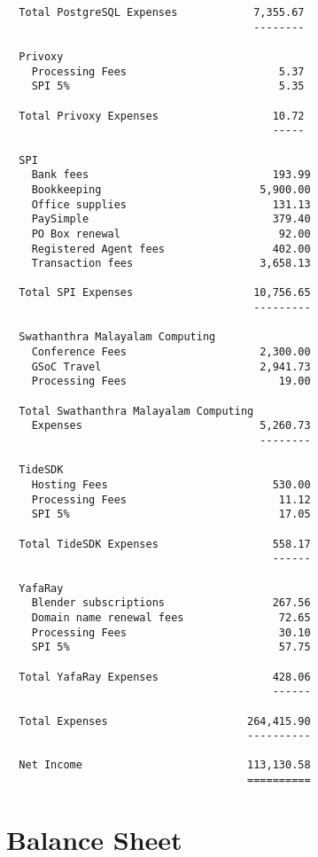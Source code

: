 \documentclass[letterpaper]{report}
\begin{document}
\begin{verbatim}
  Total PostgreSQL Expenses            7,355.67
                                       --------

  Privoxy
    Processing Fees                        5.37
    SPI 5%                                 5.35

  Total Privoxy Expenses                  10.72
                                          -----

  SPI
    Bank fees                             193.99
    Bookkeeping                         5,900.00
    Office supplies                       131.13
    PaySimple                             379.40
    PO Box renewal                         92.00
    Registered Agent fees                 402.00
    Transaction fees                    3,658.13

  Total SPI Expenses                   10,756.65
                                       ---------

  Swathanthra Malayalam Computing
    Conference Fees                     2,300.00
    GSoC Travel                         2,941.73
    Processing Fees                        19.00

  Total Swathanthra Malayalam Computing
    Expenses                            5,260.73
                                        --------

  TideSDK
    Hosting Fees                          530.00
    Processing Fees                        11.12
    SPI 5%                                 17.05

  Total TideSDK Expenses                  558.17
                                          ------

  YafaRay
    Blender subscriptions                 267.56
    Domain name renewal fees               72.65
    Processing Fees                        30.10
    SPI 5%                                 57.75

  Total YafaRay Expenses                  428.06
                                          ------

  Total Expenses                      264,415.90
                                      ----------

  Net Income                          113,130.58
                                      ==========
\end{verbatim}

\section{Balance Sheet}
\end{document}
